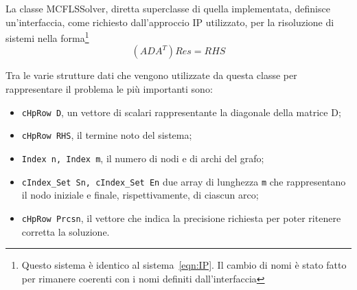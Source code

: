 La classe MCFLSSolver, diretta superclasse di quella implementata, definisce un'interfaccia, come richiesto dall'approccio IP utilizzato, per la risoluzione di sistemi nella forma\footnote{Questo sistema è identico al sistema~\eqref{eqn:IP}. Il cambio di nomi è stato fatto per rimanere coerenti con i nomi definiti dall'interfaccia}
\begin{equation}
\label{eqn:ADAT}
(ADA^T)Res = RHS
\end{equation}

Tra le varie strutture dati che vengono utilizzate da questa classe per rappresentare il problema le più importanti sono:
\begin{itemize}
\item \texttt{cHpRow D}, un vettore di scalari rappresentante la diagonale della matrice D;
\item \texttt{cHpRow RHS}, il termine noto del sistema;
\item \texttt{Index n, Index m}, il numero di nodi e di archi del grafo;
\item \texttt{cIndex\_Set Sn, cIndex\_Set En} due array di lunghezza \texttt{m} che rappresentano il nodo iniziale e finale, rispettivamente, di ciascun arco;
\item \texttt{cHpRow Prcsn}, il vettore che indica la precisione richiesta per poter ritenere corretta la soluzione.
\end{itemize}

